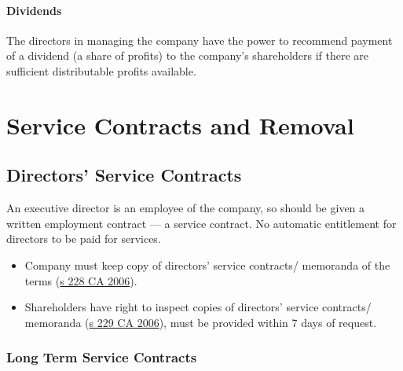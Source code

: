 \documentclass[
]{article}
\providecommand{\tightlist}{%
  \setlength{\itemsep}{0pt}\setlength{\parskip}{0pt}}
\begin{document}
\hypertarget{dividends}{%
\paragraph{Dividends}\label{dividends}}

The directors in managing the company have the power to recommend
payment of a dividend (a share of profits) to the company's shareholders
if there are sufficient distributable profits available.

\hypertarget{service-contracts-and-removal}{%
\section{Service Contracts and
Removal}\label{service-contracts-and-removal}}

\hypertarget{directors-service-contracts}{%
\subsection{Directors' Service
Contracts}\label{directors-service-contracts}}

An executive director is an employee of the company, so should be given
a written employment contract --- a service contract. No automatic
entitlement for directors to be paid for services.

\begin{itemize}
\tightlist
\item
  Company must keep copy of directors' service contracts/ memoranda of
  the terms
  (\href{https://www.legislation.gov.uk/ukpga/2006/46/section/228}{s 228
  CA 2006}).
\item
  Shareholders have right to inspect copies of directors' service
  contracts/ memoranda
  (\href{https://www.legislation.gov.uk/ukpga/2006/46/section/229}{s 229
  CA 2006}), must be provided within 7 days of request.
\end{itemize}

\hypertarget{long-term-service-contracts}{%
\subsubsection{Long Term Service
Contracts}\label{long-term-service-contracts}}
\end{document}
